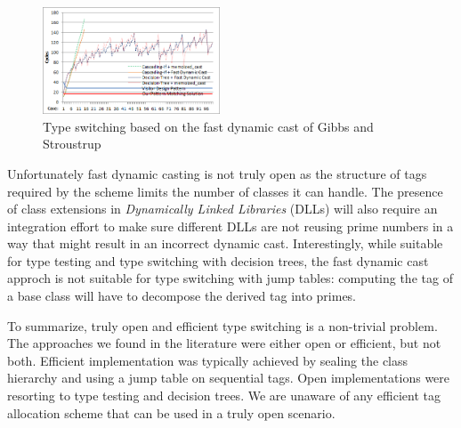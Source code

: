 \begin{figure}[htbp]
  \centering
    \includegraphics[width=0.47\textwidth]{DCast-vs-Visitors2.png}
  \caption{Type switching based on the fast dynamic cast of Gibbs and Stroustrup~\cite{FastDynCast}}
  \label{fig:DCastVis2}
\end{figure}


\noindent
Unfortunately fast dynamic casting is not truly open as the structure of tags 
required by the scheme limits the number of classes it can handle. 
The presence of class extensions in \emph{Dynamically Linked Libraries} (DLLs) 
will also require an integration effort to make sure different DLLs are not 
reusing prime numbers in a way that might result in an incorrect dynamic cast.
Interestingly, while suitable for type testing and type switching with decision 
trees, the fast dynamic cast approch is not suitable for type switching with 
jump tables: computing the tag of a base class will have to decompose the 
derived tag into primes.

To summarize, truly open and efficient type switching is a non-trivial problem. 
The approaches we found in the literature were either open or efficient, 
but not both. Efficient implementation was typically achieved by sealing the 
class hierarchy and using a jump table on sequential tags. Open implementations 
were resorting to type testing and decision trees. 
We are unaware of any efficient tag allocation scheme that can be used in a 
truly open scenario.
